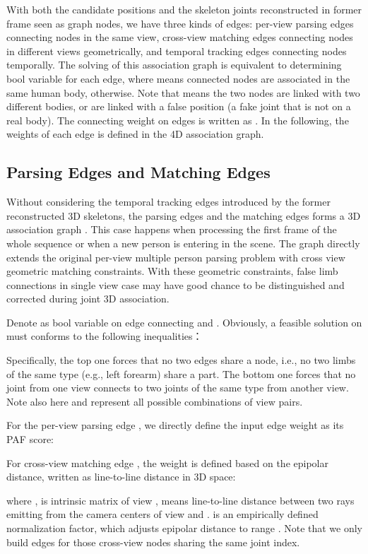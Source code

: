\documentclass[10pt,twocolumn,letterpaper]{article}
\begin{document}
With both the candidate positions  and the skeleton joints reconstructed in former frame seen as graph nodes, we have three kinds of edges: per-view parsing edges  connecting nodes in the same view, cross-view matching edges  connecting nodes in different views geometrically, and temporal tracking edges  connecting nodes temporally. The solving of this association graph is equivalent to determining bool variable  for each edge, where  means connected nodes are associated in the same human body,  otherwise. Note that  means the two nodes are linked with two different bodies, or are linked with a false position (a fake joint that is not on a real body). The connecting weight on edges is written as . In the following, the weights of each edge is defined in the 4D association graph.

\subsection{Parsing Edges and Matching Edges}
\label{sec:sec:gp_graph}
Without considering the temporal tracking edges introduced by the former reconstructed 3D skeletons, the parsing edges and the matching edges forms a 3D association graph . This case happens when processing the first frame of the whole sequence or when a new person is entering in the scene.
The graph  directly extends the original per-view multiple person parsing problem \cite{cao2018openpose} with cross view geometric matching constraints. With these geometric constraints, false limb connections in single view case may have good chance to be distinguished and corrected during joint 3D association.

Denote  as bool variable on edge connecting  and . Obviously, a feasible solution  on  must conforms to the following inequalities：

Specifically, the top one forces that no two edges share a node, i.e., no two limbs of the same type (e.g., left forearm) share a part. The bottom one forces that no joint from one view connects to two joints of the same type from another view. Note also here  and  represent all possible combinations of view pairs.

For the per-view parsing edge , we directly define the input edge weight as its PAF score:

For cross-view matching edge , the weight is defined based on the epipolar distance, written as line-to-line distance in 3D space:


where ,  is intrinsic matrix of view ,
 means line-to-line distance between two rays emitting from the camera centers of view 
and .  is an empirically defined normalization factor, which adjusts epipolar distance to range . Note that we only build edges for those cross-view nodes sharing the same joint index.
\end{document}
